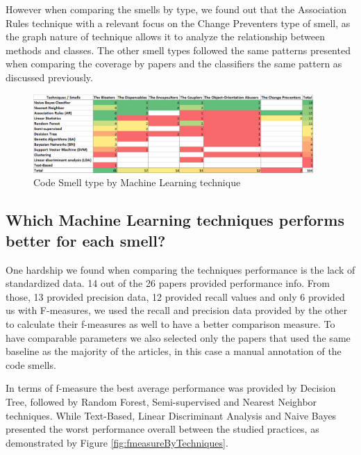 However when comparing the smells by type, we found out that the Association Rules technique with a relevant focus on the Change Preventers type of smell, as the graph nature of technique allows it to analyze the relationship between methods and classes. The other smell types followed the same patterns presented when comparing the coverage by papers and the classifiers the same pattern as discussed previously.

\begin{figure}[!ht] 
    \centering
	\caption{Code Smell type by Machine Learning technique}
	\label{fig:smellsTypeXMLTechniques}
	\includegraphics[width=0.95\textwidth]{imagens/smellsTypeXMLTechniques.png}
\end{figure}

\subsection{Which Machine Learning techniques performs better for each smell?}

One hardship we found when comparing the techniques performance is the lack of standardized data. 14 out of the 26 papers provided performance info. From those, 13 provided precision data, 12 provided recall values and only 6 provided us with F-measures, we used the recall and precision data provided by the other to calculate their f-measures as well to have a better comparison measure. To have comparable parameters we also selected only the papers that used the same baseline as the majority of the articles, in this case a manual annotation of the code smells.

In terms of f-measure the best average performance was provided by Decision Tree, followed by Random Forest, Semi-supervised and Nearest Neighbor techniques. While Text-Based, Linear Discriminant Analysis and Naive Bayes presented the worst performance overall between the studied practices, as demonstrated by Figure \ref{fig:fmeasureByTechniques}.

